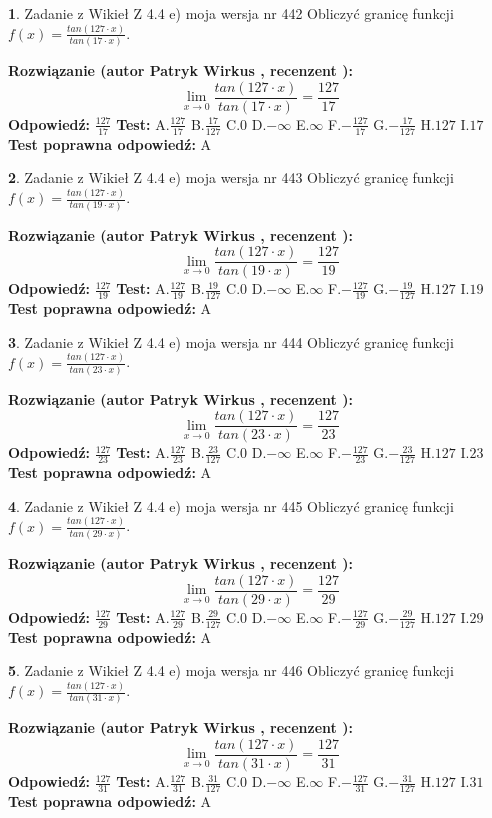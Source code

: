 \documentclass[12pt, a4paper]{article}
\theoremstyle{definition} %
\newtheorem{zad}{}
\newcommand{\zadStart}[1]{\begin{zad}#1\newline}
\newcommand{\zadStop}{\end{zad}}
\newcommand{\rozwStart}[2]{\noindent \textbf{Rozwiązanie (autor #1 , recenzent #2): }\newline}
\newcommand{\rozwStop}{\newline}
\newcommand{\odpStart}{\noindent \textbf{Odpowiedź:}\newline}
\newcommand{\odpStop}{\newline}
\newcommand{\testStart}{\noindent \textbf{Test:}\newline}
\newcommand{\testStop}{\newline}
\newcommand{\kluczStart}{\noindent \textbf{Test poprawna odpowiedź:}\newline}
\newcommand{\kluczStop}{\newline}
\begin{document}
\zadStart{Zadanie z Wikieł Z 4.4 e) moja wersja nr 442}
Obliczyć granicę funkcji $f(x)=\frac{tan(127\cdot x)}{tan(17\cdot x)}$.
\zadStop
\rozwStart{Patryk Wirkus}{}
$$\lim\limits_{x\to 0}\frac{tan(127\cdot x)}{tan(17\cdot x)}=
\frac{127}{17}$$
\rozwStop
\odpStart
$\frac{127}{17}$
\odpStop
\testStart
A.$\frac{127}{17}$
B.$\frac{17}{127}$
C.$0$
D.$-\infty$
E.$\infty$
F.$-\frac{127}{17}$
G.$-\frac{17}{127}$
H.$127$
I.$17$
\testStop
\kluczStart
A
\kluczStop



\zadStart{Zadanie z Wikieł Z 4.4 e) moja wersja nr 443}
Obliczyć granicę funkcji $f(x)=\frac{tan(127\cdot x)}{tan(19\cdot x)}$.
\zadStop
\rozwStart{Patryk Wirkus}{}
$$\lim\limits_{x\to 0}\frac{tan(127\cdot x)}{tan(19\cdot x)}=
\frac{127}{19}$$
\rozwStop
\odpStart
$\frac{127}{19}$
\odpStop
\testStart
A.$\frac{127}{19}$
B.$\frac{19}{127}$
C.$0$
D.$-\infty$
E.$\infty$
F.$-\frac{127}{19}$
G.$-\frac{19}{127}$
H.$127$
I.$19$
\testStop
\kluczStart
A
\kluczStop



\zadStart{Zadanie z Wikieł Z 4.4 e) moja wersja nr 444}
Obliczyć granicę funkcji $f(x)=\frac{tan(127\cdot x)}{tan(23\cdot x)}$.
\zadStop
\rozwStart{Patryk Wirkus}{}
$$\lim\limits_{x\to 0}\frac{tan(127\cdot x)}{tan(23\cdot x)}=
\frac{127}{23}$$
\rozwStop
\odpStart
$\frac{127}{23}$
\odpStop
\testStart
A.$\frac{127}{23}$
B.$\frac{23}{127}$
C.$0$
D.$-\infty$
E.$\infty$
F.$-\frac{127}{23}$
G.$-\frac{23}{127}$
H.$127$
I.$23$
\testStop
\kluczStart
A
\kluczStop



\zadStart{Zadanie z Wikieł Z 4.4 e) moja wersja nr 445}
Obliczyć granicę funkcji $f(x)=\frac{tan(127\cdot x)}{tan(29\cdot x)}$.
\zadStop
\rozwStart{Patryk Wirkus}{}
$$\lim\limits_{x\to 0}\frac{tan(127\cdot x)}{tan(29\cdot x)}=
\frac{127}{29}$$
\rozwStop
\odpStart
$\frac{127}{29}$
\odpStop
\testStart
A.$\frac{127}{29}$
B.$\frac{29}{127}$
C.$0$
D.$-\infty$
E.$\infty$
F.$-\frac{127}{29}$
G.$-\frac{29}{127}$
H.$127$
I.$29$
\testStop
\kluczStart
A
\kluczStop



\zadStart{Zadanie z Wikieł Z 4.4 e) moja wersja nr 446}
Obliczyć granicę funkcji $f(x)=\frac{tan(127\cdot x)}{tan(31\cdot x)}$.
\zadStop
\rozwStart{Patryk Wirkus}{}
$$\lim\limits_{x\to 0}\frac{tan(127\cdot x)}{tan(31\cdot x)}=
\frac{127}{31}$$
\rozwStop
\odpStart
$\frac{127}{31}$
\odpStop
\testStart
A.$\frac{127}{31}$
B.$\frac{31}{127}$
C.$0$
D.$-\infty$
E.$\infty$
F.$-\frac{127}{31}$
G.$-\frac{31}{127}$
H.$127$
I.$31$
\testStop
\kluczStart
A
\kluczStop
\end{document}

